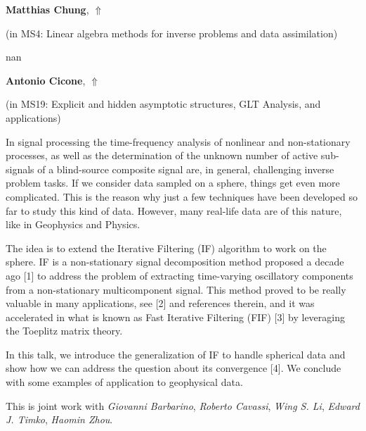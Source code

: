 \documentclass[ILAS2025-program.tex]{subfiles}
\begin{document}
     \hypertarget{down0202}{}\begin{ilasabstract}
    
    \textbf{Matthias Chung},  \hfill \hyperlink{up0202}{$\Uparrow$}
    
    (in {\color{mstitle}MS4: Linear algebra methods for inverse problems and data assimilation})
        
        \mtskip
    nan\end{ilasabstract}
     \hypertarget{down0217}{}\begin{ilasabstract}
    
    \textbf{Antonio Cicone},  \hfill \hyperlink{up0217}{$\Uparrow$}
    
    (in {\color{mstitle}MS19: Explicit and hidden asymptotic structures, GLT Analysis, and applications})
        
        \mtskip
    In signal processing the time-frequency analysis of nonlinear and non-stationary processes, as well as the determination of the unknown number of active sub-signals of a blind-source composite signal are, in general, challenging inverse problem tasks. If we consider data sampled on a sphere, things get even more complicated. This is the reason why just a few techniques have been developed so far to study this kind of data. However, many real-life data are of this nature, like in Geophysics and Physics.

The idea is to extend the Iterative Filtering (IF) algorithm to work on the sphere. IF is a non-stationary signal decomposition method proposed a decade ago [1] to address the problem of extracting time-varying oscillatory components from a non-stationary multicomponent signal. This method proved to be really valuable in many applications, see [2] and references therein, and it was accelerated in what is known as Fast Iterative Filtering (FIF) [3] by leveraging the Toeplitz matrix theory.

In this talk, we introduce the generalization of IF to handle spherical data and show how we can address the question about its convergence [4]. We conclude with some examples of application to geophysical data.

This is joint work with {\em Giovanni Barbarino}, {\em Roberto Cavassi}, {\em Wing S. Li}, {\em Edward J. Timko}, {\em Haomin Zhou}.


\end{ilasabstract}
\end{document}
